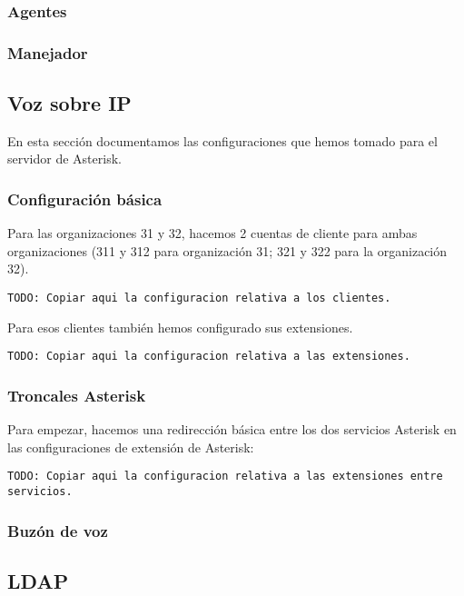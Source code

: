 \documentclass[]{article}
\begin{document}
\subsubsection{Agentes}

\subsubsection{Manejador}

\subsection{Voz sobre IP}

En esta sección documentamos las configuraciones que hemos tomado para el servidor de Asterisk.

\subsubsection{Configuración básica}

Para las organizaciones 31 y 32, hacemos 2 cuentas de cliente para ambas organizaciones (311 y 312 para organización 31; 321 y 322 para la organización 32).

\begin{lstlisting}
TODO: Copiar aqui la configuracion relativa a los clientes.
\end{lstlisting}

Para esos clientes también hemos configurado sus extensiones.

\begin{lstlisting}
TODO: Copiar aqui la configuracion relativa a las extensiones.
\end{lstlisting}

\subsubsection{Troncales Asterisk}

Para empezar, hacemos una redirección básica entre los dos servicios Asterisk en las configuraciones de extensión de Asterisk:

\begin{lstlisting}
TODO: Copiar aqui la configuracion relativa a las extensiones entre servicios.
\end{lstlisting}

\subsubsection{Buzón de voz}

\subsection{LDAP}
\end{document}
